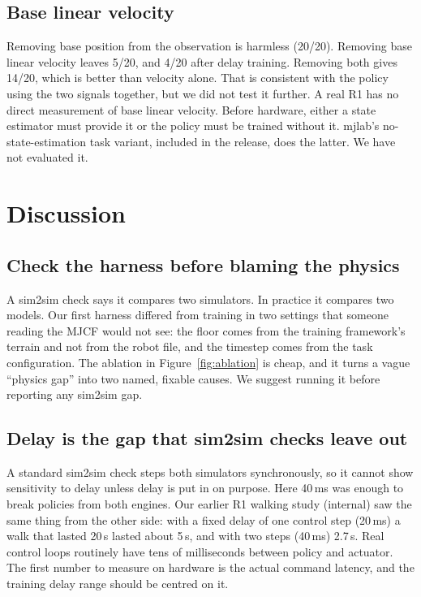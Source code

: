 \documentclass[11pt]{article}
\begin{document}
\subsection{Base linear velocity}
Removing base position from the observation is harmless (20/20). Removing base linear velocity leaves 5/20, and 4/20 after delay training. Removing both gives 14/20, which is better than velocity alone. That is consistent with the policy using the two signals together, but we did not test it further. A real R1 has no direct measurement of base linear velocity. Before hardware, either a state estimator must provide it or the policy must be trained without it. mjlab's no-state-estimation task variant, included in the release, does the latter. We have not evaluated it.

\section{Discussion}\label{sec:discussion}
\subsection{Check the harness before blaming the physics}
A sim2sim check says it compares two simulators. In practice it compares two models. Our first harness differed from training in two settings that someone reading the MJCF would not see: the floor comes from the training framework's terrain and not from the robot file, and the timestep comes from the task configuration. The ablation in Figure~\ref{fig:ablation} is cheap, and it turns a vague ``physics gap'' into two named, fixable causes. We suggest running it before reporting any sim2sim gap.

\subsection{Delay is the gap that sim2sim checks leave out}
A standard sim2sim check steps both simulators synchronously, so it cannot show sensitivity to delay unless delay is put in on purpose. Here 40\,ms was enough to break policies from both engines. Our earlier R1 walking study (internal) saw the same thing from the other side: with a fixed delay of one control step (20\,ms) a walk that lasted 20\,s lasted about 5\,s, and with two steps (40\,ms) 2.7\,s. Real control loops routinely have tens of milliseconds between policy and actuator. The first number to measure on hardware is the actual command latency, and the training delay range should be centred on it.
\end{document}
